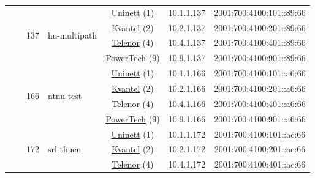 \begin{small}
\begin{center}
\begin{longtable}{|c|c|c|c|c|c|c|c|}
  &  & \multirow{4}{*}{\tiny{137}} & \multicolumn{1}{|l|}{\multirow{4}{*}{\tiny{hu-multipath}}} & \multicolumn{2}{|c|}{\tiny{\href{https://www.uninett.no}{Uninett} (1)}} & \tiny{10.1.1.137} & \tiny{2001:700:4100:101::89:66} \\* \cline{5-5}\cline{6-6}\cline{7-7}\cline{8-8}
  &  &  &  & \multicolumn{2}{|c|}{\tiny{\href{http://kvantel.no}{Kvantel} (2)}} & \tiny{10.2.1.137} & \tiny{2001:700:4100:201::89:66} \\* \cline{5-5}\cline{6-6}\cline{7-7}\cline{8-8}
  &  &  &  & \multicolumn{2}{|c|}{\tiny{\href{https://www.telenor.no}{Telenor} (4)}} & \tiny{10.4.1.137} & \tiny{2001:700:4100:401::89:66} \\* \cline{5-5}\cline{6-6}\cline{7-7}\cline{8-8}
  &  &  &  & \multicolumn{2}{|c|}{\tiny{\href{http://www.powertech.no}{PowerTech} (9)}} & \tiny{10.9.1.137} & \tiny{2001:700:4100:901::89:66} \\* \cline{3-3}\cline{4-4}\cline{5-5}\cline{6-6}\cline{7-7}\cline{8-8}
  &  & \multirow{4}{*}{\tiny{166}} & \multicolumn{1}{|l|}{\multirow{4}{*}{\tiny{ntnu-test}}} & \multicolumn{2}{|c|}{\tiny{\href{https://www.uninett.no}{Uninett} (1)}} & \tiny{10.1.1.166} & \tiny{2001:700:4100:101::a6:66} \\* \cline{5-5}\cline{6-6}\cline{7-7}\cline{8-8}
  &  &  &  & \multicolumn{2}{|c|}{\tiny{\href{http://kvantel.no}{Kvantel} (2)}} & \tiny{10.2.1.166} & \tiny{2001:700:4100:201::a6:66} \\* \cline{5-5}\cline{6-6}\cline{7-7}\cline{8-8}
  &  &  &  & \multicolumn{2}{|c|}{\tiny{\href{https://www.telenor.no}{Telenor} (4)}} & \tiny{10.4.1.166} & \tiny{2001:700:4100:401::a6:66} \\* \cline{5-5}\cline{6-6}\cline{7-7}\cline{8-8}
  &  &  &  & \multicolumn{2}{|c|}{\tiny{\href{http://www.powertech.no}{PowerTech} (9)}} & \tiny{10.9.1.166} & \tiny{2001:700:4100:901::a6:66} \\* \cline{3-3}\cline{4-4}\cline{5-5}\cline{6-6}\cline{7-7}\cline{8-8}
  &  & \multirow{4}{*}{\tiny{172}} & \multicolumn{1}{|l|}{\multirow{4}{*}{\tiny{srl-thuen}}} & \multicolumn{2}{|c|}{\tiny{\href{https://www.uninett.no}{Uninett} (1)}} & \tiny{10.1.1.172} & \tiny{2001:700:4100:101::ac:66} \\* \cline{5-5}\cline{6-6}\cline{7-7}\cline{8-8}
  &  &  &  & \multicolumn{2}{|c|}{\tiny{\href{http://kvantel.no}{Kvantel} (2)}} & \tiny{10.2.1.172} & \tiny{2001:700:4100:201::ac:66} \\* \cline{5-5}\cline{6-6}\cline{7-7}\cline{8-8}
  &  &  &  & \multicolumn{2}{|c|}{\tiny{\href{https://www.telenor.no}{Telenor} (4)}} & \tiny{10.4.1.172} & \tiny{2001:700:4100:401::ac:66} \\* \cline{5-5}\cline{6-6}\cline{7-7}\cline{8-8}

\end{longtable}
\end{center}
\end{small}
